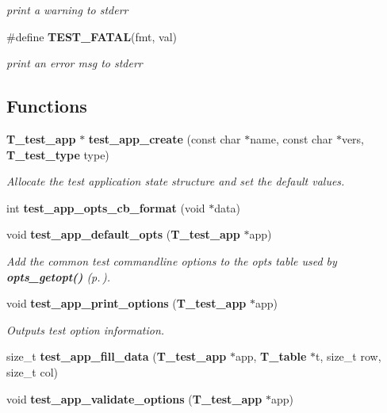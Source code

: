 \begin{CompactItemize}
\begin{CompactList}\small\item\em print a warning to stderr\item\end{CompactList}\item 
\#define {\bf TEST\_\-FATAL}(fmt, val)
\begin{CompactList}\small\item\em print an error msg to stderr\item\end{CompactList}\end{CompactItemize}
\subsection*{Functions}
\begin{CompactItemize}
\item 
{\bf T\_\-test\_\-app} $\ast$ {\bf test\_\-app\_\-create} (const char $\ast$name, const char $\ast$vers, {\bf T\_\-test\_\-type} type)
\begin{CompactList}\small\item\em Allocate the test application state structure and set the default values.\item\end{CompactList}\item 
int {\bf test\_\-app\_\-opts\_\-cb\_\-format} (void $\ast$data)
\item 
void {\bf test\_\-app\_\-default\_\-opts} ({\bf T\_\-test\_\-app} $\ast$app)
\begin{CompactList}\small\item\em Add the common test commandline options to the opts table used by {\bf opts\_\-getopt()} {\rm (p.\,\pageref{group__opts_a3})}.\item\end{CompactList}\item 
void {\bf test\_\-app\_\-print\_\-options} ({\bf T\_\-test\_\-app} $\ast$app)
\begin{CompactList}\small\item\em Outputs test option information.\item\end{CompactList}\item 
size\_\-t {\bf test\_\-app\_\-fill\_\-data} ({\bf T\_\-test\_\-app} $\ast$app, {\bf T\_\-table} $\ast$t, size\_\-t row, size\_\-t col)
\item 
void {\bf test\_\-app\_\-validate\_\-options} ({\bf T\_\-test\_\-app} $\ast$app)

\end{CompactItemize}
